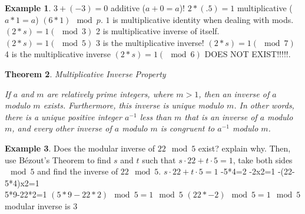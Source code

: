 \documentclass[letterpaper,10pt]{article}
\theoremstyle{plain}
\newtheorem{thm}{Theorem}[section]
\theoremstyle{definition}
\newtheorem{exmp}[thm]{Example}
\theoremstyle{remark}
\begin{document}
\begin{exmp}
$3+(-3)=0$ additive ($a+0=a$)!
\newline
$2*(.5)=1$ multiplicative ($a*1=a$)
\newline
$(6*1)\mod p$. $1$ is multiplicative identity when dealing with mods.
\newline
$(2*s)=1 (\mod 3)$ 2 is multiplicative inverse of itself.
\newline
$(2*s)=1 (\mod 5)$ 3 is the multiplicative inverse!
\newline
$(2*s)=1 (\mod 7)$ 4 is the multiplicative inverse
\newline
$(2*s)=1 (\mod 6)$ DOES NOT EXIST!!!!!.
\newline

\end{exmp}
\begin{thm}{Multiplicative Inverse Property}

If $a$ and $m$ are relatively prime integers, where $m > 1$, then an inverse of $a$ modulo $m$ exists. Furthermore, this inverse is unique modulo $m$. In other words, there is a unique positive integer $a^{-1}$ less than $m$ that is an inverse of $a$ modulo $m$, and every other inverse of $a$ modulo $m$ is congruent to $a^{-1}$ modulo $m$.

\end{thm}
\begin{exmp} Does the modular inverse of $22 \mod 5$ exist? explain why. Then, use Bézout's Theorem to find $s$ and $t$ such that $s\cdot 22+t\cdot 5=1$, take both sides $\mod 5$ and find the inverse of $22 \mod 5$.
\newline
$s\cdot22+t\cdot 5=1$
-5*4=2
-2x2=1
-(22-5*4)x2=1
\newline $ $\\
5*9-22*2=1
\newline
$(5*9-22*2)\mod 5=1\mod 5$
\newline
$(22*-2)\mod 5=1\mod 5$
\newline
modular inverse is $3$
\newline


\end{exmp}



\newpage
\end{document}
